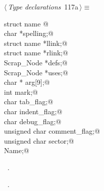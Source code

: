 \documentclass[a4paper]{report}
\begin{document}
\begin{flushleft} \small
\begin{minipage}{\linewidth}\label{scrap250}\raggedright\small
{} $\langle\,${\it Type declarations}\nobreak\ {\footnotesize {117a}}$\,\rangle\equiv$
\vspace{-1ex}
\begin{list}{}{} \item
\mbox{}\verb@typedef struct name {@\\
\mbox{}\verb@  char *spelling;@\\
\mbox{}\verb@  struct name *llink;@\\
\mbox{}\verb@  struct name *rlink;@\\
\mbox{}\verb@  Scrap_Node *defs;@\\
\mbox{}\verb@  Scrap_Node *uses;@\\
\mbox{}\verb@  char * arg[9];@\\
\mbox{}\verb@  int mark;@\\
\mbox{}\verb@  char tab_flag;@\\
\mbox{}\verb@  char indent_flag;@\\
\mbox{}\verb@  char debug_flag;@\\
\mbox{}\verb@  unsigned char comment_flag;@\\
\mbox{}\verb@  unsigned char sector;@\\
\mbox{}\verb@} Name;@\\
\mbox{}\verb@@{\NWsep}
\end{list}
\vspace{-1.5ex}
\footnotesize
\begin{list}{}{\setlength{\itemsep}{-\parsep}\setlength{\itemindent}{-\leftmargin}}
\item \NWtxtMacroDefBy\ .
\item \NWtxtMacroRefIn\ .

\end{list}
\end{minipage}
\end{flushleft}
\end{document}

